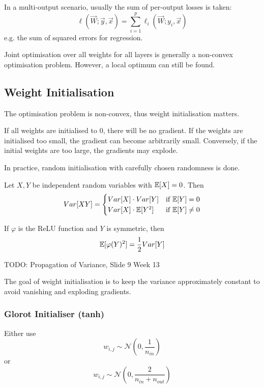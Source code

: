 In a multi-output scenario, usually the sum of per-output
losses is taken:
\begin{equation*}
    \ell(\vec{W}; \vec{y}, \vec{x}) =
    \sum_{i=1}^p{\ell_i(\vec{W}; y_i, \vec{x})}
\end{equation*}
e.g. the sum of squared errors for regression.

Joint optimisation over all weights for all layers is
generally a non-convex optimisation problem.
However, a local optimum can still be found.


\subsection{Weight Initialisation}
The optimisation problem is non-convex,
thus weight initialisation matters.

If all weights are initialised to $0$,
there will be no gradient.
If the weights are initialised too small,
the gradient can become arbitrarily small.
Conversely, if the initial weights are too large,
the gradients may explode.

In practice, random initialisation with carefully chosen
randomness is done.

\begin{theorem}
    Let $X, Y$ be independent random variables with
    $\mathbb{E}[X] = 0$. Then
    \begin{equation*}
        Var[X Y] =
        \begin{cases}
            Var[X] \cdot Var[Y] & \text{if $\mathbb{E}[Y] = 0$} \\
            Var[X] \cdot \mathbb{E}[Y^2] & \text{if $\mathbb{E}[Y] \neq 0$}
        \end{cases}
    \end{equation*}
    
    If $\varphi$ is the ReLU function and $Y$ is symmetric, then
    \begin{equation*}
        \mathbb{E}[\varphi(Y)^2] = \frac{1}{2} Var[Y]
    \end{equation*}
\end{theorem}

TODO: Propagation of Variance, Slide 9 Week 13

The goal of weight initialisation is to keep the variance
approximately constant to avoid vanishing and exploding gradients.

\subsubsection{Glorot Initialiser (tanh)}
Either use
\begin{equation*}
    w_{i,j} \sim \mathcal{N}\left(0, \frac{1}{n_{in}}\right)
\end{equation*}
or
\begin{equation*}
    w_{i,j} \sim \mathcal{N}\left(0, \frac{2}{n_{in} + n_{out}}\right)
\end{equation*}

